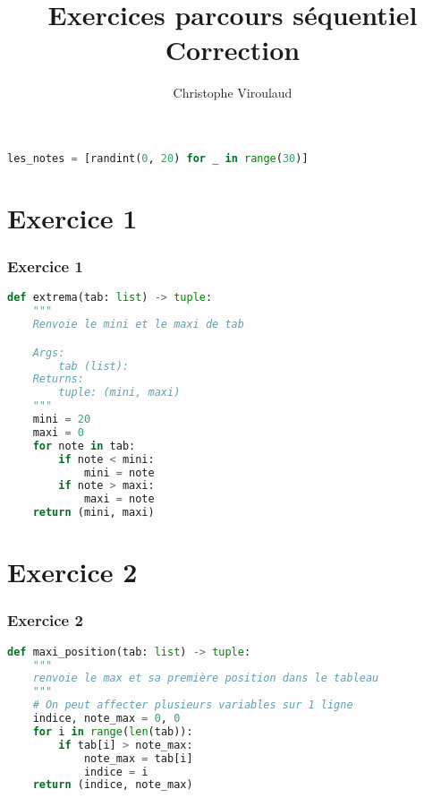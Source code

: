 \documentclass[svgnames,11pt]{beamer}
\author[]{Christophe Viroulaud}
\title{Exercices parcours séquentiel\\Correction}
\date{\framebox{\textbf{Algo 02}}}
\institute{Première - NSI}
\begin{document}
\begin{frame}
\titlepage
\end{frame}
\begin{frame}[fragile]
    \frametitle{}

\begin{center}
\begin{lstlisting}[language=Python , basicstyle=\ttfamily\small, xleftmargin=2em, xrightmargin=2em]
les_notes = [randint(0, 20) for _ in range(30)]
\end{lstlisting}
\label{CODE}
\end{center}

\end{frame}
\section{Exercice 1}
\begin{frame}[fragile]
    \frametitle{Exercice 1}

\begin{center}
\begin{lstlisting}[language=Python , basicstyle=\ttfamily\small, xleftmargin=2em, xrightmargin=2em]
def extrema(tab: list) -> tuple:
    """
    Renvoie le mini et le maxi de tab

    Args:
        tab (list): 
    Returns:
        tuple: (mini, maxi)
    """
    mini = 20
    maxi = 0
    for note in tab:
        if note < mini:
            mini = note
        if note > maxi:
            maxi = note
    return (mini, maxi)
\end{lstlisting}
\end{center}    

\end{frame}
\section{Exercice 2}
\begin{frame}[fragile]
    \frametitle{Exercice 2}

\begin{center}
\begin{lstlisting}[language=Python , basicstyle=\ttfamily\small, xleftmargin=2em, xrightmargin=2em]
def maxi_position(tab: list) -> tuple:
    """
    renvoie le max et sa première position dans le tableau
    """
    # On peut affecter plusieurs variables sur 1 ligne
    indice, note_max = 0, 0
    for i in range(len(tab)):
        if tab[i] > note_max:
            note_max = tab[i]
            indice = i
    return (indice, note_max)
\end{lstlisting}
\end{center}    

\end{frame}
\end{document}
